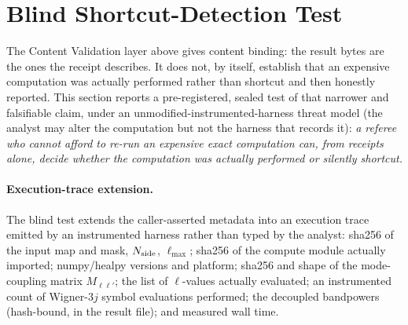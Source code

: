 \documentclass[11pt]{article}
\begin{document}
\section{Blind Shortcut-Detection Test}
\label{sec:blind-test}

The Content Validation layer above gives content binding: the result bytes
are the ones the receipt describes. It does not, by itself, establish that an
expensive computation was actually performed rather than shortcut and then
honestly reported. This section reports a pre-registered, sealed test of that
narrower and falsifiable claim, under an unmodified-instrumented-harness
threat model (the analyst may alter the computation but not the harness that
records it): \emph{a referee who cannot afford to re-run an expensive exact
computation can, from receipts alone, decide whether the computation was
actually performed or silently shortcut.}

\paragraph{Execution-trace extension.} The blind test extends the
caller-asserted metadata into an execution trace emitted by an instrumented
harness rather than typed by the analyst: sha256 of the input map and mask,
\(N_{\rm side}\), \(\ell_{\max}\); sha256 of the compute module actually
imported; numpy/healpy versions and platform; sha256 and shape of the
mode-coupling matrix \(M_{\ell\ell'}\); the list of \(\ell\)-values actually
evaluated; an instrumented count of Wigner-3\(j\) symbol evaluations
performed; the decoupled bandpowers (hash-bound, in the result file); and
measured wall time.
\end{document}
